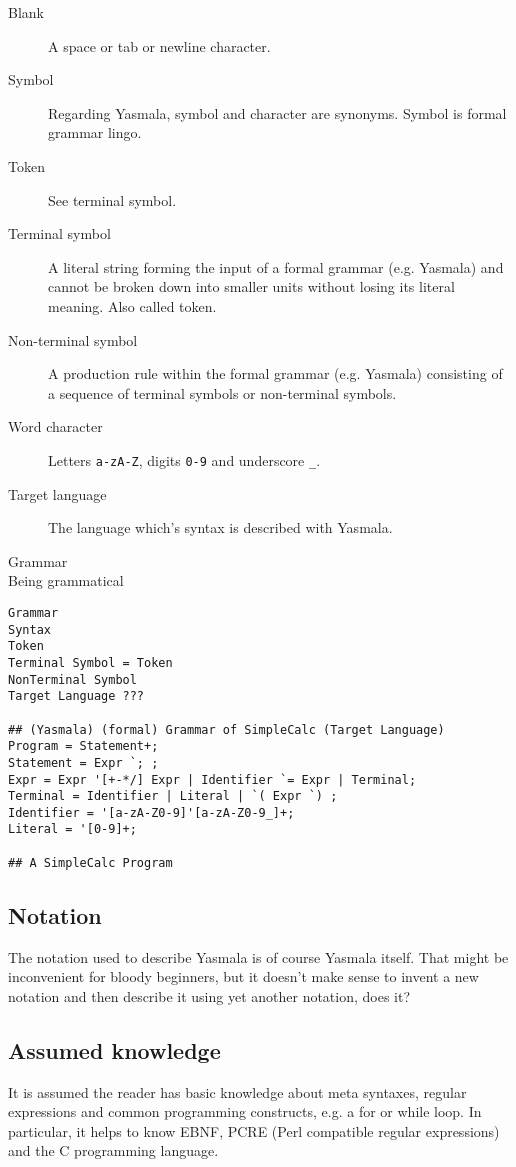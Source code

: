 \documentclass[a4paper]{report}
\begin{document}
\begin{description}
\item[Blank] A space or tab or newline character.
\item[Symbol] Regarding Yasmala, symbol and character are synonyms. Symbol is
     formal grammar lingo.
\item[Token] See terminal symbol.
\item[Terminal symbol] A literal string forming the input of a formal grammar
     (e.g. Yasmala) and cannot be broken down into smaller units without losing
     its literal meaning. Also called token.
\item[Non-terminal symbol] A production rule within the formal grammar (e.g.
     Yasmala) consisting of a sequence of terminal symbols or non-terminal
     symbols. 
\item[Word character] Letters \verb|a-zA-Z|, digits \verb|0-9| and underscore \verb|_|. 
\item[Target language] The language which's syntax is described with Yasmala.
\item[Grammar]  
\item[Being grammatical] 
\end{description}

\begin{verbatim}
Grammar
Syntax
Token
Terminal Symbol = Token
NonTerminal Symbol
Target Language ???

## (Yasmala) (formal) Grammar of SimpleCalc (Target Language)
Program = Statement+;
Statement = Expr `; ;
Expr = Expr '[+-*/] Expr | Identifier `= Expr | Terminal;
Terminal = Identifier | Literal | `( Expr `) ;
Identifier = '[a-zA-Z0-9]'[a-zA-Z0-9_]+;
Literal = '[0-9]+;

## A SimpleCalc Program 
\end{verbatim}

\label{Notation}
\subsection{Notation}

The notation used to describe Yasmala is of course Yasmala itself. That might be
inconvenient for bloody beginners, but it doesn't make sense to invent a new
notation and then describe it using yet another notation, does it?

\subsection{Assumed knowledge}
It is assumed the reader has basic knowledge about meta syntaxes, regular
expressions and common programming constructs, e.g. a for or while loop. In
particular, it helps to know EBNF, PCRE (Perl compatible regular expressions)
and the C programming language.
\end{document}

